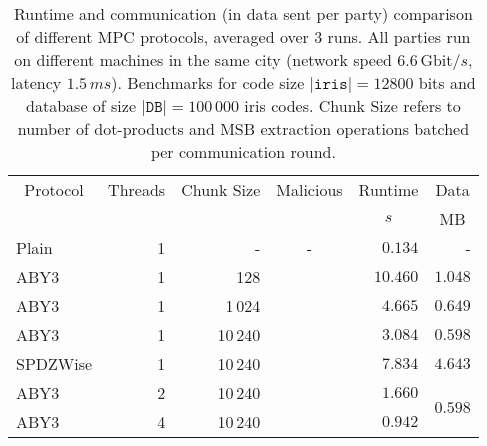 \documentclass[a4paper,11pt,
]{article}
\newcommand{\cmark}{\ding{51}}%
\newcommand{\xmark}{\ding{55}}%
\begin{document}
\begin{table}[ht]
    \centering
    \caption{Runtime and communication (in data sent per party) comparison of different MPC protocols, averaged over 3 runs. All parties run on different machines in the same city (network speed $6.6\,\text{Gbit}/s$, latency $1.5\,ms$). Benchmarks for code size $|\texttt{iris}| = 12800$ bits and database of size $|\texttt{DB}| = 100\,000$ iris codes. Chunk Size refers to number of dot-products and MSB extraction operations batched per communication round.}
    \label{tab::bench_network_100k}
    \begin{tabular}{lrrcrr}
        \toprule
        \multicolumn{1}{c}{Protocol} & \multicolumn{1}{c}{Threads} & \multicolumn{1}{c}{Chunk Size} & \multicolumn{1}{c}{Malicious} & \multicolumn{1}{c}{Runtime} & \multicolumn{1}{c}{Data} \\
                                     &                             &                                &                               & \multicolumn{1}{c}{$s$}     & \multicolumn{1}{c}{MB}   \\
        \midrule
        Plain                        & 1                           & -                              & -                             & $0.134$                     & -                        \\
        ABY3                         & 1                           & 128                            & \xmark                        & $10.460$                    & $1.048$                  \\
        ABY3                         & 1                           & 1\,024                         & \xmark                        & $4.665$                     & $0.649$                  \\
        ABY3                         & 1                           & 10\,240                        & \xmark                        & $3.084$                     & $0.598$                  \\
        SPDZWise                     & 1                           & 10\,240                        & \cmark                        & $7.834$                     & $4.643$                  \\
        \midrule
        ABY3                         & 2                           & 10\,240                        & \xmark                        & $1.660$                     & \multirow{6}{*}{$0.598$} \\
        ABY3                         & 4                           & 10\,240                        & \xmark                        & $0.942$                     &                          \\

\end{tabular}
\end{table}
\end{document}
